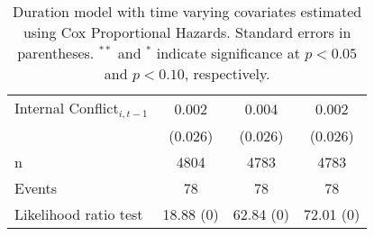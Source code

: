 \begin{table}[ht]
{\begin{tabular}{lccc}
  Internal Conflict$_{i,t-1}$ & 0.002 & 0.004 & 0.002 \\ 
   & (0.026) & (0.026) & (0.026) \\ 
   \hline
n & 4804 & 4783 & 4783 \\ 
  Events & 78 & 78 & 78 \\ 
  Likelihood ratio test & 18.88 (0) & 62.84 (0) & 72.01 (0) \\ 
   \hline
\hline
\end{tabular}
}
\caption{Duration model with time varying covariates estimated using Cox Proportional Hazards. Standard errors in parentheses. $^{**}$ and $^{*}$ indicate significance at $p< 0.05 $ and $p< 0.10 $, respectively.} 
\label{tab:regResults}
\end{table}
